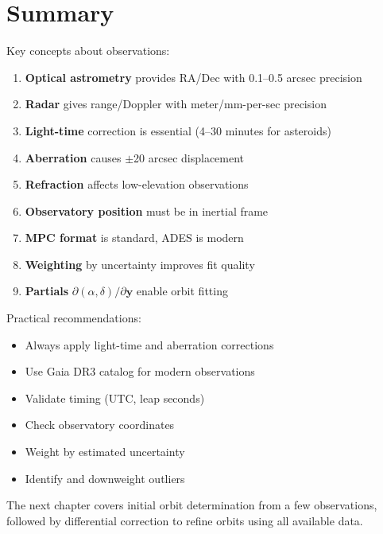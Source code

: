 \section{Summary}

Key concepts about observations:

\begin{enumerate}
    \item \textbf{Optical astrometry} provides RA/Dec with 0.1--0.5 arcsec precision
    \item \textbf{Radar} gives range/Doppler with meter/mm-per-sec precision
    \item \textbf{Light-time} correction is essential (4--30 minutes for asteroids)
    \item \textbf{Aberration} causes $\pm$20 arcsec displacement
    \item \textbf{Refraction} affects low-elevation observations
    \item \textbf{Observatory position} must be in inertial frame
    \item \textbf{MPC format} is standard, ADES is modern
    \item \textbf{Weighting} by uncertainty improves fit quality
    \item \textbf{Partials} $\partial(\alpha,\delta)/\partial\mathbf{y}$ enable orbit fitting
\end{enumerate}

Practical recommendations:
\begin{itemize}
    \item Always apply light-time and aberration corrections
    \item Use Gaia DR3 catalog for modern observations
    \item Validate timing (UTC, leap seconds)
    \item Check observatory coordinates
    \item Weight by estimated uncertainty
    \item Identify and downweight outliers
\end{itemize}

The next chapter covers initial orbit determination from a few observations, followed by differential correction to refine orbits using all available data.
